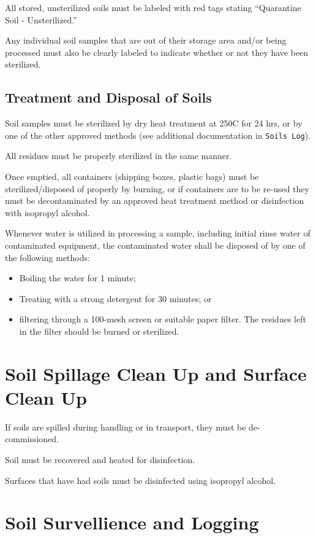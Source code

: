 \documentclass[12pt]{../SOP3}\usepackage[]{graphicx}\usepackage[]{color}
\begin{document}
\NP All stored, unsterilized soils must be labeled with red tags stating ``Quarantine Soil - Unsterilized.''

\NP Any individual soil samples that are out of their storage area and/or being processed must also be clearly labeled to indicate whether or not they have been sterilized.


\subsection{Treatment and Disposal of Soils}

\NP Soil samples must be sterilized by dry heat treatment at 250\degree C for 24 hrs, or by one of the other approved methods (see additional documentation in \texttt{Soils Log}).

\NP All residues must be properly sterilized in the same manner.

\NP Once emptied, all containers (shipping boxes, plastic bags) must be sterilized/disposed of properly by burning, or if containers are to be re-used they must be decontaminated by an approved heat treatment method or disinfection with isopropyl alcohol.

\NP Whenever water is utilized in processing a sample, including initial rinse water of contaminated equipment, the contaminated water shall be disposed of by one of the following methods: 

\begin{itemize}
  \item Boiling the water for 1 minute; 
  \item Treating with a strong detergent for 30 minutes; or 
  \item filtering through a 100-mesh screen or suitable paper filter. The residues left in the filter should be burned or sterilized.
\end{itemize}

\section{Soil Spillage Clean Up and Surface Clean Up}

\NP If soils are spilled during handling or in transport, they must be de-commissioned. 

\NP Soil must be recovered and heated for disinfection. 

\NP Surfaces that have had soils must be disinfected using isopropyl alcohol. 

\section{Soil Survellience and Logging}
\end{document}
